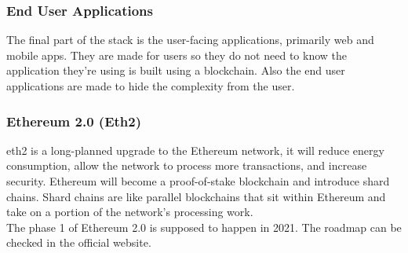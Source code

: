 \subsubsection{End User Applications}
The final part of the stack is the user-facing applications, primarily web and mobile apps.  They are made for users so they do not need to know the application they're using is built using a blockchain. Also the end user applications are made to hide the complexity from the user.

\subsubsection{Ethereum 2.0 (Eth2)}
\acrshort{eth2}\cite{eth2} is a long-planned upgrade to the Ethereum network, it will reduce energy consumption, allow the network to process more transactions, and increase security.  Ethereum will become a proof-of-stake blockchain and introduce shard chains. Shard chains are like parallel blockchains that sit within Ethereum and take on a portion of the network's processing work.\\

The phase 1 of Ethereum 2.0 is supposed to happen in 2021. The roadmap can be checked in the official website\cite{eth2Roadmap}.